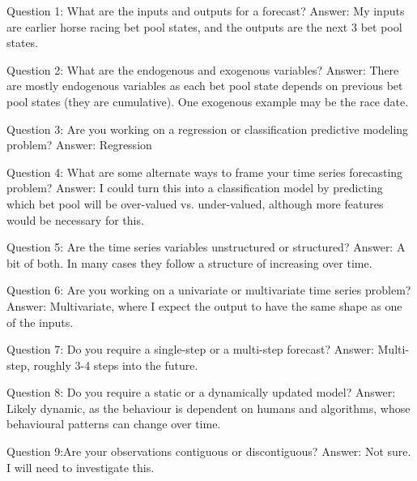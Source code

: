 \documentclass[11pt]{article}
\begin{document}
    Question 1: What are the inputs and outputs for a forecast?
    Answer: My inputs are earlier horse racing bet pool states, and the outputs are  the next 3 bet pool states.

    Question 2: What are the endogenous and exogenous variables?
    Answer: There are mostly endogenous variables as each bet pool state depends on previous bet pool states (they are cumulative).
    One exogenous example may be the race date.

    Question 3: Are you working on a regression or classification predictive modeling problem?
    Answer: Regression

    Question 4: What are some alternate ways to frame your time series forecasting problem?
    Answer: I could turn this into a classification model by predicting which bet pool will be over-valued vs. under-valued,
    although more features would be necessary for this.

    Question 5: Are the time series variables unstructured or structured?
    Answer: A bit of both. In many cases they follow a structure of increasing over time.

    Question 6: Are you working on a univariate or multivariate time series problem?
    Answer: Multivariate, where I expect the output to have the same shape as one of the inputs.

    Question 7: Do you require a single-step or a multi-step forecast?
    Answer: Multi-step, roughly 3-4 steps into the future.

    Question 8: Do you require a static or a dynamically updated model?
    Answer: Likely dynamic, as the behaviour is dependent on humans and algorithms, whose behavioural patterns can change over time.

    Question 9:Are your observations contiguous or discontiguous?
    Answer: Not sure. I will need to investigate this.
\end{document}
